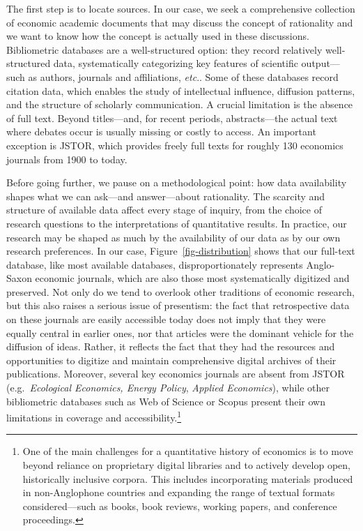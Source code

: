 \documentclass[
]{interact}
\begin{document}
The first step is to locate sources. In our case, we seek a
comprehensive collection of economic academic documents that may discuss
the concept of rationality and we want to know how the concept is
actually used in these discussions. Bibliometric databases are a
well-structured option: they record relatively well-structured data,
systematically categorizing key features of scientific output---such as
authors, journals and affiliations, \emph{etc}.. Some of these databases
record citation data, which enables the study of intellectual influence,
diffusion patterns, and the structure of scholarly communication. A
crucial limitation is the absence of full text. Beyond titles---and, for
recent periods, abstracts---the actual text where debates occur is
usually missing or costly to access. An important exception is JSTOR,
which provides freely full texts for roughly 130 economics journals from
1900 to today.

Before going further, we pause on a methodological point: how data
availability shapes what we can ask---and answer---about rationality.
The scarcity and structure of available data affect every stage of
inquiry, from the choice of research questions to the interpretations of
quantitative results. In practice, our research may be shaped as much by
the availability of our data as by our own research preferences. In our
case, Figure~\ref{fig-distribution} shows that our full-text database,
like most available databases, disproportionately represents Anglo-Saxon
economic journals, which are also those most systematically digitized
and preserved. Not only do we tend to overlook other traditions of
economic research, but this also raises a serious issue of presentism:
the fact that retrospective data on these journals are easily accessible
today does not imply that they were equally central in earlier ones, nor
that articles were the dominant vehicle for the diffusion of ideas.
Rather, it reflects the fact that they had the resources and
opportunities to digitize and maintain comprehensive digital archives of
their publications. Moreover, several key economics journals are absent
from JSTOR (e.g.~\emph{Ecological Economics, Energy Policy},
\emph{Applied Economics}), while other bibliometric databases such as
Web of Science or Scopus present their own limitations in coverage and
accessibility.\footnote{One of the main challenges for a quantitative
  history of economics is to move beyond reliance on proprietary digital
  libraries and to actively develop open, historically inclusive
  corpora. This includes incorporating materials produced in
  non-Anglophone countries and expanding the range of textual formats
  considered---such as books, book reviews, working papers, and
  conference proceedings.}
\end{document}
